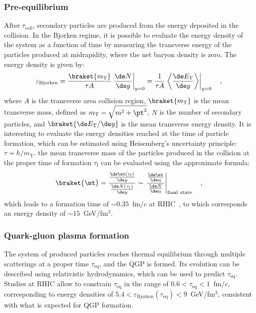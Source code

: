 \subsubsection{Pre-equilibrium}
After $\tau_\mathrm{coll}$, secondary particles are produced from the energy deposited in the collision. In the Bjorken regime, it is possible to evaluate the energy density of the system as a function of time by measuring the transverse energy of the particles produced at midrapidity, where the net baryon density is zero. The energy density is given by:
\begin{equation*}
    \varepsilon_\mathrm{Bjorken} = \frac{\braket{m_\mathrm{T}}}{\tau A} \left. \frac{\de N}{\de y}\right\rvert_{y=0} = \frac{1}{\tau A}\left. \left\langle\frac{\de E_\mathrm{T}}{\de y}\right\rangle\right\rvert_{y=0} \quad ,
\end{equation*}
where $A$ is the transverse area collision region, $\braket{m_\mathrm{T}}$ is the mean transverse mass, defined as $m_\mathrm{T} = \sqrt{m^2 + \pt^2}$, $N$ is the number of secondary particles, and $\braket{\de E_\mathrm{T}/\de y}$ is the mean transverse energy density. It is interesting to evaluate the energy densities reached at the time of particle formation, which can be estimated using Heisemberg's uncertainty principle: $\tau = \hbar/m_\mathrm{T}$. the mean transverse mass of the particles produced in the collision at the proper time of formation $\tau_\mathrm{f}$ can be evaluated using the approximate formula:
\begin{equation*}
    \braket{\mt} = \frac{\frac{\de \et(\tau_\mathrm{f})}{\de y}}{\frac{\de N(\tau_\mathrm{f})}{\de y}}\sim \left. \frac{\frac{\de \et}{\de \eta}}{\frac{\de N}{\de \eta}}\right\rvert_\mathrm{final~state}\quad ,
\end{equation*}
which leads to a formation time of $\sim 0.35$~fm/$c$ at RHIC~\cite{PHENIX:2004vcz}, to which corresponds an energy density of $\sim 15$~GeV/fm$^3$.

\subsubsection{Quark-gluon plasma formation}
The system of produced particles reaches thermal equilibrium through multiple scatterings at a proper time $\tau_\mathrm{eq}$, and the QGP is formed. Its evolution can be described using relativistic hydrodynamics, which can be used to predict $\tau_\mathrm{eq}$. Studies at RHIC allow to constrain $\tau_\mathrm{eq}$ in the range of $0.6<\tau_\mathrm{eq}<1$~fm/$c$, corresponding to energy densities of $5.4 < \varepsilon_\mathrm{Bjorken}(\tau_\mathrm{eq})< 9$~GeV/fm$^3$, consistent with what is expected for QGP formation. 

